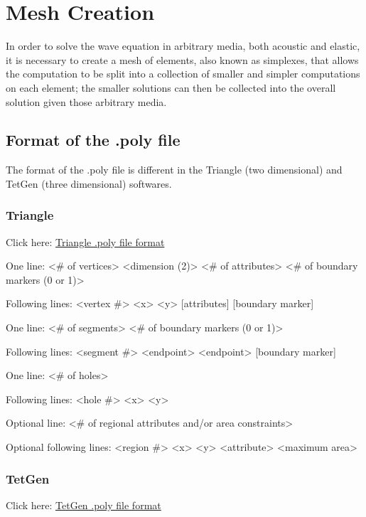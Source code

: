 \newpage
\section{Mesh Creation} \label{Mesh-Creation}

In order to solve the wave equation in arbitrary media, both acoustic and elastic, it is necessary to create a mesh of elements, also known as simplexes, that allows the computation to be split into a collection of smaller and simpler computations on each element; the smaller solutions can then be collected into the overall solution given those arbitrary media. 

\subsection{Format of the .poly file}

The format of the .poly file is different in the Triangle (two dimensional) and TetGen (three dimensional) softwares. 

\subsubsection{Triangle \cite{TrianglePoly}}

Click here: \href{https://www.cs.cmu.edu/~quake/triangle.poly.html}{Triangle .poly file format} 


One line: <\# of vertices> <dimension (2)> <\# of attributes> <\# of boundary markers (0 or 1)>

Following lines: <vertex \#> <x> <y> [attributes] [boundary marker]

One line: <\# of segments> <\# of boundary markers (0 or 1)>

Following lines: <segment \#> <endpoint> <endpoint> [boundary marker]

One line: <\# of holes>

Following lines: <hole \#> <x> <y>

Optional line: <\# of regional attributes and/or area constraints>

Optional following lines: <region \#> <x> <y> <attribute> <maximum area>


\subsubsection{TetGen \cite{TetGenPoly}}

Click here: \href{http://wias-berlin.de/software/tetgen/fformats.poly.html}{TetGen .poly file format}

